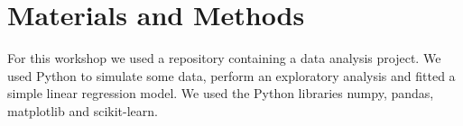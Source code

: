 \section{Materials and Methods}


For this workshop we used a repository containing a data analysis project. We used Python to simulate some data, perform an exploratory analysis and fitted a simple linear regression model. We used the Python libraries numpy, pandas, matplotlib and scikit-learn. 